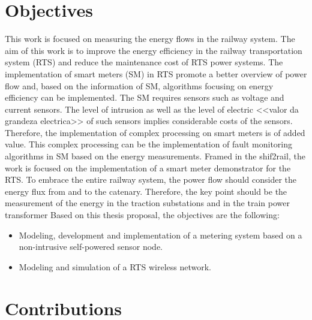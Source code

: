 




\section{Objectives}

This work is focused on measuring the energy flows in the railway system.
The aim of this work is to improve the energy efficiency in the railway transportation system (RTS) and reduce the maintenance cost of RTS power systems.
The implementation of smart meters (SM) in RTS promote a better overview of power flow and, based on the information of SM, algorithms focusing on energy efficiency can be implemented.
The SM requires sensors such as voltage and current sensors. The level of intrusion as well as the level of electric <<valor da grandeza electrica>> of such sensors implies considerable costs of the sensors.
Therefore, the implementation of complex processing on smart meters is of added value. This complex processing can be the implementation of fault monitoring algorithms in SM based on the energy measurements.
Framed in the shif2rail, the work is focused on the implementation of a smart meter demonstrator for the RTS. To embrace the entire railway system, the power flow should consider the energy flux from and to the catenary. Therefore, the key point should be the measurement of the energy in the traction substations and in the train power transformer 
Based on this thesis proposal, the objectives are the following:

\begin{itemize}
	\setlength\itemsep{0em}
	
	\item	Modeling, development and implementation of a metering system based on a non-intrusive self-powered sensor node.

	\item Modeling and simulation of a RTS wireless network.

	
\end{itemize}


\section{Contributions}

